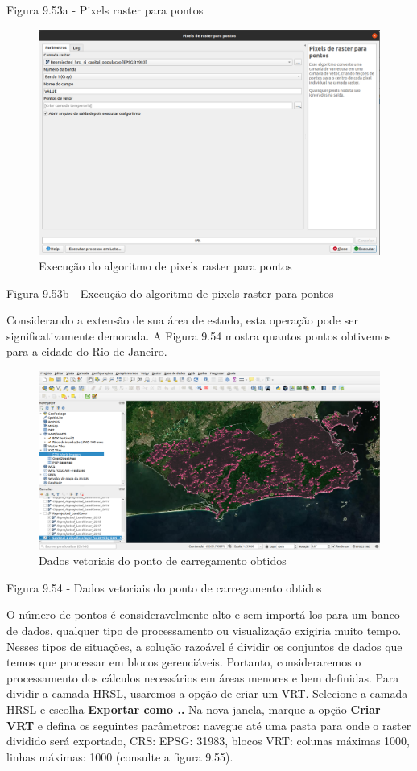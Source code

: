 \documentclass[
]{krantz}
\begin{document}
Figura 9.53a - Pixels raster para pontos

\begin{figure}
\centering
\includegraphics{media/modulo9/fig953_b.png}
\caption{Execução do algoritmo de pixels raster para pontos}
\end{figure}

Figura 9.53b - Execução do algoritmo de pixels raster para pontos

Considerando a extensão de sua área de estudo, esta operação pode ser significativamente demorada. A Figura 9.54 mostra quantos pontos obtivemos para a cidade do Rio de Janeiro.

\begin{figure}
\centering
\includegraphics{media/modulo9/fig954.png}
\caption{Dados vetoriais do ponto de carregamento obtidos}
\end{figure}

Figura 9.54 - Dados vetoriais do ponto de carregamento obtidos

O número de pontos é consideravelmente alto e sem importá-los para um banco de dados, qualquer tipo de processamento ou visualização exigiria muito tempo. Nesses tipos de situações, a solução razoável é dividir os conjuntos de dados que temos que processar em blocos gerenciáveis. Portanto, consideraremos o processamento dos cálculos necessários em áreas menores e bem definidas. Para dividir a camada HRSL, usaremos a opção de criar um VRT. Selecione a camada HRSL e escolha \textbf{Exportar como ..} Na nova janela, marque a opção \textbf{Criar VRT} e defina os seguintes parâmetros: navegue até uma pasta para onde o raster dividido será exportado, CRS: EPSG: 31983, blocos VRT: colunas máximas 1000, linhas máximas: 1000 (consulte a figura 9.55).
\end{document}

